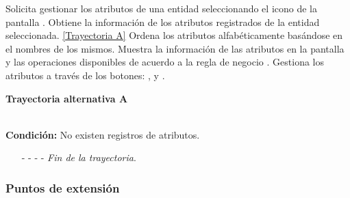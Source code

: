 \begin{UCtrayectoria}
	\UCpaso[\UCactor] Solicita gestionar los atributos de una entidad seleccionando el icono  de la pantalla .
	\UCpaso[\UCsist] Obtiene la información de los atributos registrados de la entidad seleccionada. \hyperlink{CU7-1-1:TAA}{[Trayectoria A]}
	\UCpaso[\UCsist] Ordena los atributos alfabéticamente basándose en el nombres de los mismos.
	\UCpaso[\UCsist] Muestra la información de las atributos en la pantalla  y las operaciones disponibles de acuerdo a la regla de negocio . \label{CU7-1-1-P4}
	\UCpaso[\UCactor] Gestiona los atributos a través de los botones: , \editar y \eliminar. 
\end{UCtrayectoria}		
\hypertarget{CU7-1-1:TAA}{\textbf{Trayectoria alternativa A}}\\
\noindent \textbf{Condición:} No existen registros de atributos.
\begin{enumerate}
	\UCpaso[\UCsist] Muestra el mensaje  en la pantalla  para indicar que no hay registros de atributos para mostrar.  \label{CU7-1-1-TA1}
	\UCpaso[\UCactor] Gestiona los atributos a través del botón: . 
	\item[- -] - - {\em {Fin de la trayectoria}}.%
\end{enumerate}
\subsubsection{Puntos de extensión}

